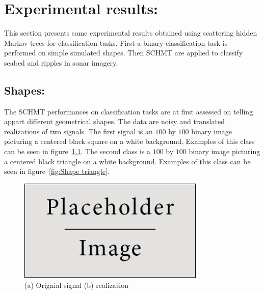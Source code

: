 \documentclass[a4paper,11pt]{report}
\begin{document}
{%
\chapter{Experimental results:}
  \label{chap:Exp}
  This section presents some experimental results obtained using scattering hidden Markov trees for classification tasks. First a binary classification task is performed on simple simulated shapes. Then SCHMT are applied to classify seabed and ripples in sonar imagery.
  
  \section{Shapes:}
		\label{sec:Exp/Shape:}
		
		The SCHMT performances on classification tasks are at first assessed on telling appart different geometrical shapes. The data are noisy and translated realizations of two signals. The first signal is an $100$ by $100$ binary image picturing a centered black square on a white background. Examples of this class can be seen in figure~\ref{fig:Shape square}. The second class is a $100$ by $100$ binary image picturing a centered black triangle on a white background. Examples of this class can be seen in figure~\ref{fig:Shape triangle}. 
		
		\begin{figure}
			\begin{center}
				\includegraphics[width=3.5in]{placeholder.jpg}
			  \caption[Shape classification: square]{(a) Orignial signal (b) realization}
			  \label{fig:Shape square}
			\end{center}
		\end{figure}
		
}
\end{document}
